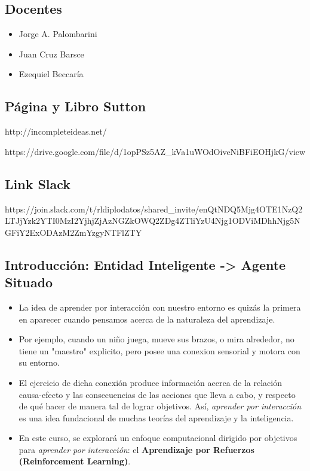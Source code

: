 \documentclass[11pt]{article}
\providecommand{\tightlist}{%
      \setlength{\itemsep}{0pt}\setlength{\parskip}{0pt}}
\begin{document}
    \subsection{Docentes}\label{docentes}

\begin{itemize}
\tightlist
\item
  Jorge A. Palombarini
\item
  Juan Cruz Barsce
\item
  Ezequiel Beccaría
\end{itemize}

\subsection{Página y Libro Sutton}\label{puxe1gina-y-libro-sutton}

http://incompleteideas.net/

https://drive.google.com/file/d/1opPSz5AZ\_kVa1uWOdOiveNiBFiEOHjkG/view

    \subsection{Link Slack}\label{link-slack}

https://join.slack.com/t/rldiplodatos/shared\_invite/enQtNDQ5Mjg4OTE1NzQ2LTJjYzk2YTI0MzI2YjhjZjAzNGZkOWQ2ZDg4ZTliYzU4Njg1ODViMDhhNjg5NGFiY2ExODAzM2ZmYzgyNTFlZTY

    \subsection{Introducción: Entidad Inteligente -\textgreater{} Agente
Situado}\label{introducciuxf3n-entidad-inteligente---agente-situado}

\begin{itemize}
\item
  La idea de aprender por interacción con nuestro entorno es quizás la
  primera en aparecer cuando pensamos acerca de la naturaleza del
  aprendizaje.
\item
  Por ejemplo, cuando un niño juega, mueve sus brazos, o mira alrededor,
  no tiene un "maestro" explicito, pero posee una conexion sensorial y
  motora con su entorno.
\item
  El ejercicio de dicha conexión produce información acerca de la
  relación causa-efecto y las consecuencias de las acciones que lleva a
  cabo, y respecto de qué hacer de manera tal de lograr objetivos. Así,
  \emph{aprender por interacción} es una idea fundacional de muchas
  teorías del aprendizaje y la inteligencia.
\item
  En este curso, se explorará un enfoque computacional dirigido por
  objetivos para \emph{aprender por interacción}: el \textbf{Aprendizaje
  por Refuerzos (Reinforcement Learning)}.
\end{itemize}
\end{document}
